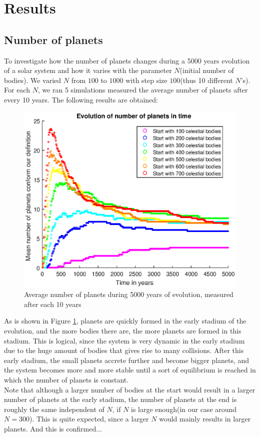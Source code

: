 \section{Results}

\subsection{Number of planets}
To investigate how the number of planets changes during a 5000 years evolution of a solar system and how it varies with the parameter $N$(initial number of bodies). We varied $N$ from $100$ to $1000$ with step size $100$(thus 10 different $N$'s). For each $N$, we ran 5 simulations measured the average number of planets after every 10 years. The following results are obtained:\\ 
\begin{figure}[H]
\centering
\includegraphics[scale=0.8]{AantPlaneten.eps}
\caption{Average number of planets during 5000 years of evolution, measured after each 10 years}
    \label{fig:AantPlaneten}
\end{figure}
As is shown in Figure \ref{fig:AantPlaneten}, planets are quickly formed in the early stadium of the evolution, and the more bodies there are, the more planets are formed in this stadium. This is logical, since the system is very dynamic in the early stadium due to the huge amount of bodies that gives rise to many collisions. After this early stadium, the small planets accrete further and become bigger planets, and the system becomes more and more stable until a sort of equilibrium is reached in which the number of planets is constant.\\

Note that although a larger number of bodies at the start would result in a larger number of planets at the early stadium, the number of planets at the end is roughly the same independent of $N$, if $N$ is large enough(in our case around $N=300$). This is quite expected, since a larger $N$ would mainly results in larger planets. And this is confirmed...

